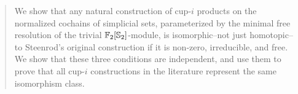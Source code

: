 
\begin{abstract}
	We show that any natural construction of cup-$i$ products on the normalized cochains of simplicial sets, parameterized by the minimal free resolution of the trivial \(\Ftwo[\Sym_2]\)-module, is isomorphic--not just homotopic--to Steenrod's original construction if it is non-zero, irreducible, and free.
	We show that these three conditions are independent, and use them to prove that all \mbox{cup-$i$} constructions in the literature represent the same isomorphism class.
\end{abstract}
